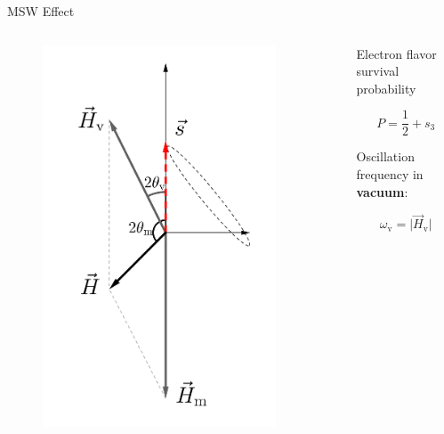 \documentclass[9pt]{beamer}
\begin{document}
\begin{darkframes}
\begin{frame}{MSW Effect}
{\begin{columns}[T]
\begin{column}{0.5\textwidth}
\begin{figure}
    \centering
    \colorbox{white}{\includegraphics[width=0.9\textwidth]{assets/matter-effect-notsolarge-density}}
\end{figure}


\end{column}%
\begin{column}{0.5\textwidth}



Electron flavor survival probability

\begin{equation*}
P = \frac{1}{2} + s_3
\end{equation*}

Oscillation frequency in {\bf vacuum}:

\begin{equation*}
    \omega_{\mathrm v} = \lvert \vec H_{\mathrm v} \rvert
\end{equation*}



\end{column}
\end{columns}}
\end{frame}
\end{darkframes}
\end{document}
